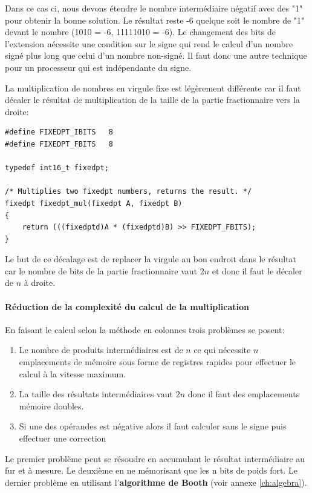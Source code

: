 Dans ce cas ci, nous devons étendre le nombre intermédiaire négatif avec des "1" pour obtenir la bonne solution. Le résultat reste -6 quelque soit le nombre de "1" devant le nombre (1010 = -6, 11111010 = -6). Le changement des bits de l'extension nécessite une condition sur le signe qui rend le calcul d'un nombre signé plus long que celui d'un nombre non-signé. Il faut donc une autre technique pour un processeur qui est indépendante du signe.

La multiplication de nombres en virgule fixe est légèrement différente car il faut décaler le résultat de multiplication de la taille de la partie fractionnaire vers la droite:

\lstset{style=customc}
\begin{lstlisting}
#define FIXEDPT_IBITS	8
#define FIXEDPT_FBITS	8

typedef int16_t fixedpt;

/* Multiplies two fixedpt numbers, returns the result. */
fixedpt fixedpt_mul(fixedpt A, fixedpt B)
{
	return (((fixedptd)A * (fixedptd)B) >> FIXEDPT_FBITS);
}
\end{lstlisting}

Le but de ce décalage est de replacer la virgule au bon endroit dans le résultat car le nombre de bits de la partie fractionnaire vaut $2n$ et donc il faut le décaler de $n$ à droite.

\paragraph{Réduction de la complexité du calcul de la multiplication}
En faisant le calcul selon la méthode en colonnes trois problèmes se posent:
\begin{enumerate}
\item Le nombre de produits intermédiaires est de $n$ ce qui nécessite $n$ emplacements de mémoire sous forme de registres rapides pour effectuer le calcul à la vitesse maximum. 
\item La taille des résultats intermédiaires vaut $2n$ donc il faut des emplacements mémoire doubles.
\item Si une des opérandes est négative alors il faut calculer sans le signe puis effectuer une correction
\end{enumerate}
Le premier problème peut se résoudre en accumulant le résultat intermédiaire au fur et à mesure. Le deuxième en ne mémorisant que les n bits de poids fort. Le dernier problème en utilisant l'\textbf{algorithme de Booth} (voir annexe \ref{ch:algebra}). 

